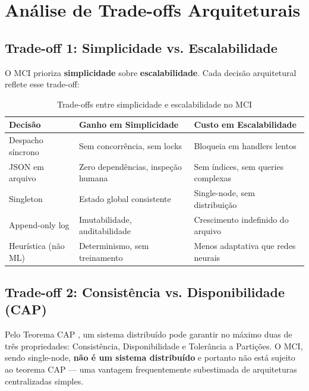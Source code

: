 \section{Análise de Trade-offs Arquiteturais}
\label{sec:tradeoffs}

\subsection{Trade-off 1: Simplicidade vs. Escalabilidade}

O MCI prioriza \textbf{simplicidade} sobre \textbf{escalabilidade}. Cada decisão arquitetural reflete esse trade-off:

\begin{table}[htbp]
\centering
\caption{Trade-offs entre simplicidade e escalabilidade no MCI}
\label{tab:simplicity-vs-scalability}
\begin{tabular}{@{}p{3.5cm}p{4.5cm}p{5.5cm}@{}}
\toprule
\textbf{Decisão} & \textbf{Ganho em Simplicidade} & \textbf{Custo em Escalabilidade} \\
\midrule
Despacho síncrono & Sem concorrência, sem locks & Bloqueia em handlers lentos \\
JSON em arquivo & Zero dependências, inspeção humana & Sem índices, sem queries complexas \\
Singleton & Estado global consistente & Single-node, sem distribuição \\
Append-only log & Imutabilidade, auditabilidade & Crescimento indefinido do arquivo \\
Heurística (não ML) & Determinismo, sem treinamento & Menos adaptativa que redes neurais \\
\bottomrule
\end{tabular}
\end{table}

\subsection{Trade-off 2: Consistência vs. Disponibilidade (CAP)}

Pelo Teorema CAP \cite{Brewer2000_CAP}, um sistema distribuído pode garantir no máximo duas de três propriedades: Consistência, Disponibilidade e Tolerância a Partições. O MCI, sendo single-node, \textbf{não é um sistema distribuído} e portanto não está sujeito ao teorema CAP — uma vantagem frequentemente subestimada de arquiteturas centralizadas simples.

